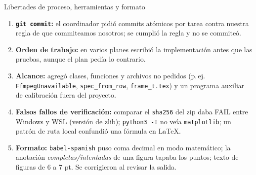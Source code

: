 \begin{frame}{Libertades de proceso, herramientas y formato}
  \footnotesize
  \begin{enumerate}
    \item \textbf{\texttt{git commit}:} el coordinador pidió commits atómicos por tarea contra
      nuestra regla de que commiteamos nosotros; se cumplió la regla y no se commiteó.
    \item \textbf{Orden de trabajo:} en varios planes escribió la implementación antes que las
      pruebas, aunque el plan pedía lo contrario.
    \item \textbf{Alcance:} agregó clases, funciones y archivos no pedidos (p.\,ej.
      \texttt{FfmpegUnavailable}, \texttt{spec\_from\_row}, \texttt{frame\_t.tex}) y un programa
      auxiliar de calibración fuera del proyecto.
    \item \textbf{Falsos fallos de verificación:} comparar el \texttt{sha256} del zip daba FAIL
      entre Windows y WSL (versión de zlib); \texttt{python3 -I} no veía \texttt{matplotlib}; un
      patrón de ruta local confundió una fórmula en LaTeX.
    \item \textbf{Formato:} \texttt{babel-spanish} puso coma decimal en modo matemático; la
      anotación \emph{completas/intentadas} de una figura tapaba los puntos; texto de figuras de
      6 a 7 pt. Se corrigieron al revisar la salida.
  \end{enumerate}
\end{frame}



